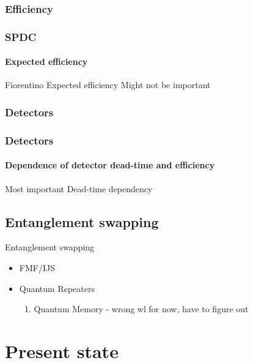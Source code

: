 \documentclass[serif,8pt]{beamer}
\begin{document}
{{\subsubsection{Efficiency}
\begin{frame}
	\frametitle{SPDC}
	\framesubtitle{Expected efficiency}
	Fiorentino Expected efficiency
	Might not be important
\end{frame}

\subsubsection{Detectors}
\begin{frame}
	\frametitle{Detectors}
	\framesubtitle{Dependence of detector dead-time and efficiency}
	\Huge Most important
	\large
Dead-time dependency
\end{frame}


\subsection{Entanglement swapping}
\begin{frame}{Entanglement swapping}
	\begin{itemize}
		\item FMF/IJS
		\item Quantum Repeaters
			\begin{enumerate}
				\item Quantum Memory - wrong wl for now, have to figure out
			\end{enumerate}
	\end{itemize}

\end{frame}

\section{Present state}


}}
\end{document}
